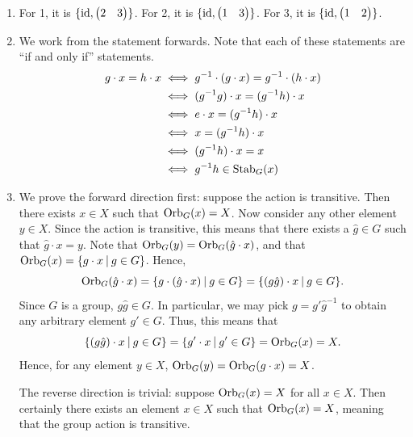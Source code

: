 \begin{enumerate}
    \item For 1, it is $\{\mathrm{id}, \begin{pmatrix}2 & 3\end{pmatrix}\}$. For 2, it is $\{\mathrm{id}, \begin{pmatrix}1 & 3\end{pmatrix}\}$. For 3, it is $\{\mathrm{id}, \begin{pmatrix}1 & 2\end{pmatrix}\}$.

    \item We work from the statement forwards. Note that each of these statements are ``if and only if'' statements.
    \begin{align*}
	    g \cdot x = h \cdot x &\iff g^{-1} \cdot (g \cdot x) = g^{-1} \cdot (h \cdot x)\\
	    &\iff (g^{-1}g) \cdot x = (g^{-1}h) \cdot x\\
	    &\iff e \cdot x = (g^{-1}h) \cdot x\\
	    &\iff x = (g^{-1}h) \cdot x\\
	    &\iff (g^{-1}h) \cdot x = x\\
	    &\iff g^{-1}h \in \mathrm{Stab}_{G}(x)
	\end{align*}

	\item We prove the forward direction first: suppose the action is transitive. Then there exists $x \in X$ such that $\mathrm{Orb}_{G}(x) = X$. Now consider any other element $y \in X$. Since the action is transitive, this means that there exists a $\hat{g} \in G$ such that $\hat{g} \cdot x = y$. Note that $\mathrm{Orb}_{G}(y) = \mathrm{Orb}_{G}(\hat{g} \cdot x)$, and that $\Orb{G}{x} = \{g \cdot x \vert g \in G\}$. Hence,
	\[
        \Orb{G}{\hat{g} \cdot x} = \{g\cdot (\hat{g} \cdot x) \vert g \in G\} = \{(g\hat{g}) \cdot x \vert g \in G\}.
	\]
	Since $G$ is a group, $g\hat{g} \in G$. In particular, we may pick $g = g'\hat{g}^{-1}$ to obtain any arbitrary element $g' \in G$. Thus, this means that
	\[
        	\{(g\hat{g}) \cdot x \vert g \in G\} = \{g' \cdot x \vert g' \in G \} = \Orb{G}{x} = X.
	\]
	Hence, for any element $y \in X$, $\mathrm{Orb}_{G}(y) = \mathrm{Orb}_{G}(g \cdot x) = X$.

	The reverse direction is trivial: suppose $\mathrm{Orb}_{G}(x) = X$ for all $x \in X$. Then certainly there exists an element $x \in X$ such that $\mathrm{Orb}_{G}(x) = X$, meaning that the group action is transitive.


\end{enumerate}
